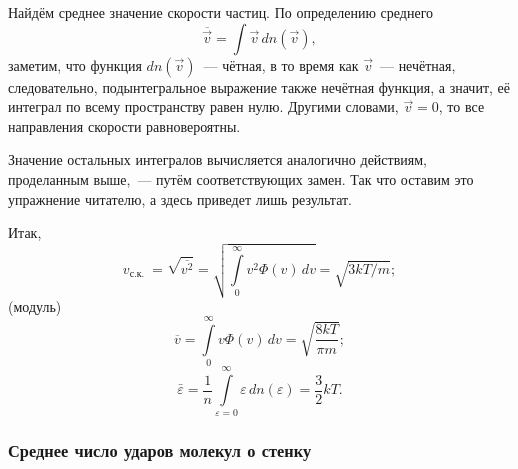 Найдём среднее значение скорости частиц. По определению среднего
\begin{equation*}
    \overline{\vec{v}} = \int \vec{v} \, dn(\vec{v}),
\end{equation*}
заметим, что функция $dn(\vec{v})$~--- чётная, в то время как $\vec{v}$~--- нечётная, следовательно, подынтегральное выражение также нечётная функция, а значит, её интеграл по всему пространству равен нулю. Другими словами, $\vec{v} = 0$, то все направления скорости равновероятны.

Значение остальных интегралов вычисляется аналогично действиям, проделанным выше,~--- путём соответствующих замен. Так что оставим это упражнение читателю, а здесь приведет лишь результат. 

Итак,  
\begin{equation}
    v_{\text {с.к. }} 
        = \sqrt{\overline{v^2}}
        = \sqrt{\int\limits_0^\infty v^2 \Phi(v) \, dv} 
        = \sqrt{3 k T / m};
\end{equation}
 (модуль) 
\begin{equation}
     \overline{v}
         = \int\limits_0^{\infty} v \Phi(v) \, dv
         = \sqrt{\frac{8 k T}{\pi m}};
\end{equation}
\begin{equation}
    \bar{\varepsilon} 
        = \frac{1}{n} \int\limits_{\varepsilon = 0}^{\infty} \varepsilon \, d n(\varepsilon) 
        = \frac{3}{2} k T.
\end{equation}

\subsubsection*{Среднее число ударов молекул о стенку}

